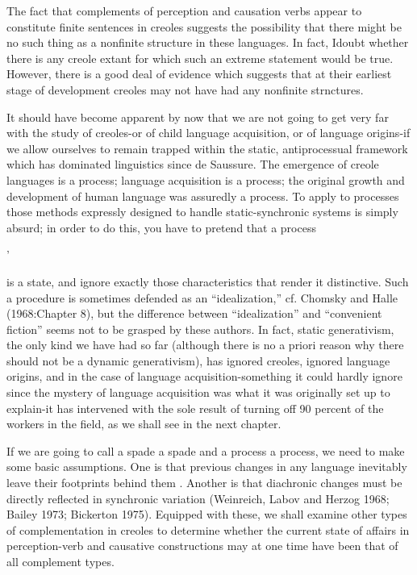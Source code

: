 The fact that complements of perception and causation verbs appear to constitute finite sentences in creoles suggests the possibility that there might be no such thing as a nonfinite structure in these languages. In fact, Idoubt whether there is any creole extant for which such an extreme statement would be true. However, there is a good deal of evidence which suggests that at their earliest stage of develop\-ment creoles may not have had any nonfinite strnctures.

It should have become apparent by now that we are not going to get very far with the study of creoles-or of child language acquisition, or of language origins-if we allow ourselves to remain trapped within the static, antiprocessual framework which has dominated linguistics since de Saussure. The emergence of creole languages is a process; language acquisition is a process; the original growth and development of human language was assuredly a process. To apply to processes those methods expressly designed to handle static-synchronic systems is simply absurd; in order to do this, you have to pretend that a process

'


is a state, and ignore exactly those characteristics that render it distinc\-tive. Such a procedure is sometimes defended as an ``idealization,'' cf. Chomsky and Halle (1968:Chapter 8), but the difference between ``idealization'' and ``convenient fiction'' seems not to be grasped by these authors. In fact, static generativism, the only kind we have had so far (although there is no a priori reason why there should not be a dynamic generativism), has ignored creoles, ignored language origins, and in the case of language acquisition-something it could hardly ignore since the mystery of language acquisition was what it was originally set up to explain-it has intervened with the sole result of turning off 90 percent of the workers in the field, as we shall see in the next chapter.

If we are going to call a spade a spade and a process a process, we need to make some basic assumptions. One is that previous changes in any language inevitably leave their footprints behind them \citep{Givan1971}. Another is that diachronic changes must be directly reflected in synchronic variation (Weinreich, Labov and Herzog 1968; Bailey 1973; Bickerton 1975). Equipped with these, we shall examine other types of complementation in creoles to determine whether the current state of affairs in perception-verb and causative constructions may at one time have been that of all complement types.


